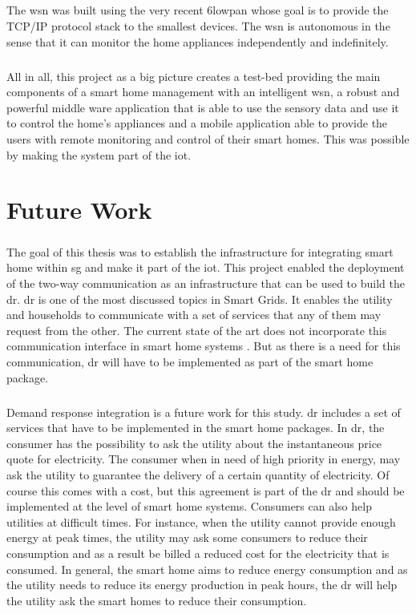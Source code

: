 \documentclass[oneside,12pt,a4paper,final]{book}
\begin{document}
\paragraph{}
The \gls{wsn} was built using the very recent \gls{6lowpan} whose goal is to provide the TCP/IP protocol stack to the smallest devices. The \gls{wsn} is autonomous in the sense that it can monitor the home appliances independently and indefinitely. 
\paragraph{}
All in all, this project as a big picture creates a test-bed providing the main components of a smart home management with an intelligent \gls{wsn}, a robust and powerful middle ware application that is able to use the sensory data and use it to control the home's appliances and a mobile application able to provide the users with remote monitoring and control of their smart homes. This was possible by making the system part of the \gls{iot}.
\chapter{Future Work}
\paragraph{}
The goal of this thesis was to establish the infrastructure for integrating smart home within \gls{sg} and make it part of the \gls{iot}. This project enabled the deployment of the two-way communication as an infrastructure that can be used to build the \gls{dr}. \gls{dr} is one of the most discussed topics in Smart Grids. It enables the utility and households to communicate with a set of services that any of them may request from the other. The current state of the art does not incorporate this communication interface in smart home systems \cite{ref15}. But as there is a need for this communication, \gls{dr} will have to be implemented as part of the smart home package.
\paragraph{}
Demand response integration is a future work for this study. \gls{dr} includes a set of services that have to be implemented in the smart home packages. In \gls{dr}, the consumer has the possibility to ask the utility about the instantaneous price quote for electricity. The consumer when in need of high priority in energy, may ask the utility to guarantee the delivery of a certain quantity of electricity. Of course this comes with a cost, but this agreement is part of the \gls{dr} and should be implemented at the level of smart home systems. Consumers can also help utilities at difficult times. For instance, when the utility cannot provide enough energy at peak times, the utility may ask some consumers to reduce their consumption and as a result be billed a reduced cost for the electricity that is consumed. In general, the smart home aims to reduce energy consumption and as the utility needs to reduce its energy production in peak hours, the \gls{dr} will help the utility ask the smart homes to reduce their consumption.
\end{document}
